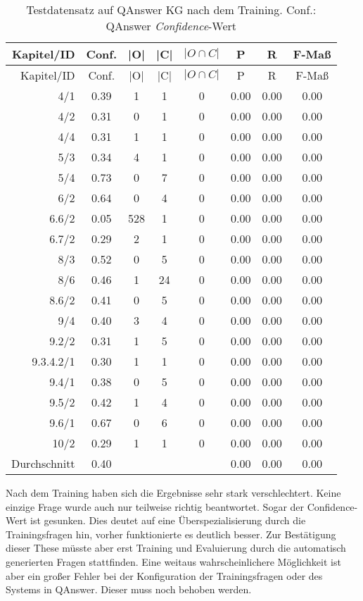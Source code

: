 \begin{longtable}{r c c c c c c c}
  \caption[Testdatensatz QAnswer nach Training]{Testdatensatz auf QAnswer KG nach dem Training.
  Conf.: QAnswer \emph{Confidence}-Wert}
  \label{tab:qanswernachtraining}
  \\
  \toprule
  Kapitel/ID    & Conf. & |O|   & |C|   & $|O \cap C|$  & P     & R     & F-Maß   \\
  \midrule
  \endfirsthead
  \toprule
  Kapitel/ID    & Conf. & |O|   & |C|   & $|O \cap C|$  & P     & R     & F-Maß   \\
  \midrule
  \endhead
	4/1			& 0.39 & 1 & 1 & 0 & 0.00 & 0.00 & 0.00 \\
	4/2			& 0.31 & 0 & 1 & 0 & 0.00 & 0.00 & 0.00 \\
	4/4			& 0.31 & 1 & 1 & 0 & 0.00 & 0.00 & 0.00 \\
	5/3			& 0.34 & 4 & 1 & 0 & 0.00 & 0.00 & 0.00 \\
	5/4			& 0.73 & 0 & 7 & 0 & 0.00 & 0.00 & 0.00 \\
	6/2			& 0.64 & 0 & 4 & 0 & 0.00 & 0.00 & 0.00 \\
	6.6/2		& 0.05 & 528 & 1 & 0 & 0.00 & 0.00 & 0.00 \\
	6.7/2		& 0.29 & 2 & 1 & 0 & 0.00 & 0.00 & 0.00 \\
	8/3			& 0.52 & 0 & 5 & 0 & 0.00 & 0.00 & 0.00 \\
	8/6			& 0.46 & 1 & 24 & 0 & 0.00 & 0.00 & 0.00 \\
	8.6/2		& 0.41 & 0 & 5 & 0 & 0.00 & 0.00 & 0.00 \\
	9/4			& 0.40 & 3 & 4 & 0 & 0.00 & 0.00 & 0.00 \\
	9.2/2		& 0.31 & 1 & 5 & 0 & 0.00 & 0.00 & 0.00 \\
	9.3.4.2/1	& 0.30 & 1 & 1 & 0 & 0.00 & 0.00 & 0.00 \\
	9.4/1		& 0.38 & 0 & 5 & 0 & 0.00 & 0.00 & 0.00 \\
	9.5/2		& 0.42 & 1 & 4 & 0 & 0.00 & 0.00 & 0.00 \\
	9.6/1		& 0.67 & 0 & 6 & 0 & 0.00 & 0.00 & 0.00 \\
	10/2		& 0.29 & 1 & 1 & 0 & 0.00 & 0.00 & 0.00 \\
  \midrule
  Durchschnitt  & 0.40 &  &  &   & 0.00 & 0.00 & 0.00 \\
  \bottomrule
\end{longtable}

Nach dem Training haben sich die Ergebnisse sehr stark verschlechtert.
Keine einzige Frage wurde auch nur teilweise richtig beantwortet.
Sogar der Confidence-Wert ist gesunken.
Dies deutet auf eine Überspezialisierung durch die Trainingsfragen hin, vorher funktionierte es deutlich besser.
Zur Bestätigung dieser These müsste aber erst Training und Evaluierung durch die automatisch generierten Fragen stattfinden.
Eine weitaus wahrscheinlichere Möglichkeit ist aber ein großer Fehler bei der Konfiguration der Trainingsfragen oder des Systems in QAnswer.
Dieser muss noch behoben werden.

